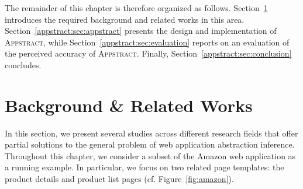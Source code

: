 The remainder of this chapter is therefore organized as follows.
Section~\ref{appstract:sec:related} introduces the required background and related works in this area.
Section~\ref{appstract:sec:appstract} presents the design and implementation of \textsc{Appstract}, while Section~\ref{appstract:sec:evaluation} reports on an evaluation of the perceived accuracy of \textsc{Appstract}.
Finally, Section~\ref{appstract:sec:conclusion} concludes.

\section{Background \& Related Works}\label{appstract:sec:related}
In this section, we present several studies across different research fields that offer partial solutions to the general problem of web application abstraction inference. 
Throughout this chapter, we consider a subset of the Amazon web application as a running example.
In particular, we focus on two related page templates: the product details and product list pages (cf. Figure~\ref{fig:amazon}).

